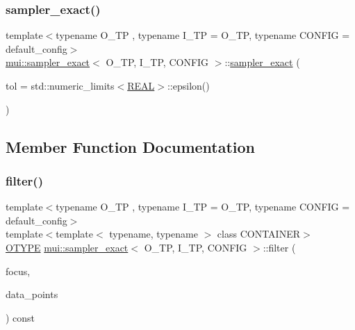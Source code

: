 \subsubsection{\texorpdfstring{sampler\+\_\+exact()}{sampler\_exact()}}
{\footnotesize\ttfamily template$<$typename O\+\_\+\+TP , typename I\+\_\+\+TP  = O\+\_\+\+TP, typename C\+O\+N\+F\+IG  = default\+\_\+config$>$ \\
\hyperlink{classmui_1_1sampler__exact}{mui\+::sampler\+\_\+exact}$<$ O\+\_\+\+TP, I\+\_\+\+TP, C\+O\+N\+F\+IG $>$\+::\hyperlink{classmui_1_1sampler__exact}{sampler\+\_\+exact} (\begin{DoxyParamCaption}\item[{\hyperlink{classmui_1_1sampler__exact_a204186f8735dcdfe021c7e3a36a077bf}{R\+E\+AL}}]{tol = {\ttfamily std\+:\+:numeric\+\_\+limits$<$\hyperlink{classmui_1_1sampler__exact_a204186f8735dcdfe021c7e3a36a077bf}{R\+E\+AL}$>$\+:\+:epsilon()} }\end{DoxyParamCaption})\hspace{0.3cm}{\ttfamily [inline]}}



\subsection{Member Function Documentation}
\mbox{\label{classmui_1_1sampler__exact_a9e35d2b8d145010125c2fd45033d7957}} 
\subsubsection{\texorpdfstring{filter()}{filter()}}
{\footnotesize\ttfamily template$<$typename O\+\_\+\+TP , typename I\+\_\+\+TP  = O\+\_\+\+TP, typename C\+O\+N\+F\+IG  = default\+\_\+config$>$ \\
template$<$template$<$ typename, typename $>$ class C\+O\+N\+T\+A\+I\+N\+ER$>$ \\
\hyperlink{classmui_1_1sampler__exact_a7543e4be38b14fb93d07b34ee4e33f4d}{O\+T\+Y\+PE} \hyperlink{classmui_1_1sampler__exact}{mui\+::sampler\+\_\+exact}$<$ O\+\_\+\+TP, I\+\_\+\+TP, C\+O\+N\+F\+IG $>$\+::filter (\begin{DoxyParamCaption}\item[{\hyperlink{classmui_1_1sampler__exact_a789e8bf4cf1dd6319c67ab7a60458948}{point\+\_\+type}}]{focus,  }\item[{const C\+O\+N\+T\+A\+I\+N\+ER$<$ \hyperlink{classmui_1_1sampler__exact_a4198aa2cc7c945895db91aae2b6cc0b2}{I\+T\+Y\+PE}, C\+O\+N\+F\+IG $>$ \&}]{data\+\_\+points }\end{DoxyParamCaption}) const\hspace{0.3cm}{\ttfamily [inline]}}


